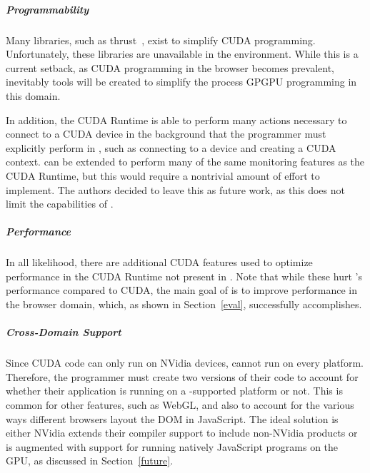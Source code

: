 
\subparagraph{Programmability} 
Many libraries, such as thrust~\cite{thrust}, exist to simplify CUDA
programming. Unfortunately, these libraries are unavailable in the \name environment. While
this is a current setback, as CUDA programming in the browser becomes prevalent,
inevitably tools will be created to simplify the process GPGPU programming in
this domain.

In addition, the CUDA Runtime is able to perform many actions necessary to
connect to a CUDA device in the background that the programmer
must explicitly perform in \namens, such as connecting to a device and creating
a CUDA context. \name can be extended to perform many of the same
monitoring features as the CUDA Runtime, but this would require a nontrivial
amount of effort to implement. The authors decided to leave this as future work,
as this does not limit the capabilities of \namens.

\subparagraph{Performance}
%
In all likelihood, there are additional CUDA features used to optimize
performance in the CUDA Runtime not present in \namens. Note that
while these hurt \namens's performance compared to CUDA, the main goal of \name
is to improve performance in the browser domain, which, as shown in
Section~\ref{eval}, \name successfully accomplishes.

\subparagraph{Cross-Domain Support} Since CUDA code can only run on NVidia
devices, \name cannot run on every platform. Therefore, the programmer must
create two versions of their code to account for whether their application is
running on a \namens-supported platform or not. This is common for other
features, such as WebGL, and also to account for the various ways different browsers
layout the DOM in JavaScript. The ideal solution is either NVidia extends their
compiler support to include non-NVidia products or \name is augmented with
support for running natively JavaScript programs on the GPU, as discussed in
Section~\ref{future}.

